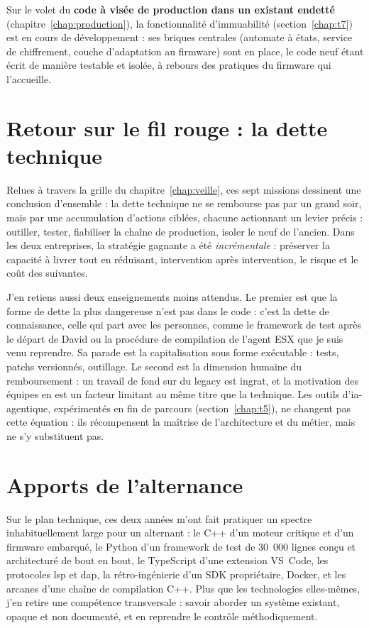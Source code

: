 Sur le volet du \textbf{code à visée de production dans un existant
endetté} (chapitre~\ref{chap:production}), la fonctionnalité d'immuabilité
(section~\ref{chap:t7}) est en cours de développement : ses briques
centrales (automate à états, service de chiffrement, couche d'adaptation au
firmware) sont en place, le code neuf étant écrit de manière testable et
isolée, à rebours des pratiques du firmware qui l'accueille.

\section{Retour sur le fil rouge : la dette technique}
Relues à travers la grille du chapitre~\ref{chap:veille}, ces sept missions
dessinent une conclusion d'ensemble : la dette technique ne se rembourse pas
par un grand soir, mais par une accumulation d'actions ciblées, chacune
actionnant un levier précis : outiller, tester, fiabiliser la chaîne de
production, isoler le neuf de l'ancien. Dans les deux entreprises, la
stratégie gagnante a été \emph{incrémentale} : préserver la capacité à livrer
tout en réduisant, intervention après intervention, le risque et le coût des
suivantes.

J'en retiens aussi deux enseignements moins attendus. Le premier est que la
forme de dette la plus dangereuse n'est pas dans le code : c'est la dette de
connaissance, celle qui part avec les personnes, comme le framework de test
après le départ de David ou la procédure de compilation de l'agent ESX que je
suis venu reprendre. Sa parade est la capitalisation sous forme exécutable :
tests, patchs versionnés, outillage. Le second est la dimension humaine du
remboursement : un travail de fond sur du legacy est ingrat, et la motivation
des équipes en est un facteur limitant au même titre que la technique. Les
outils d'\gls{ia-agentique}, expérimentés en fin de parcours
(section~\ref{chap:t5}), ne changent pas cette équation : ils récompensent
la maîtrise de l'architecture et du métier, mais ne s'y substituent pas.

\section{Apports de l'alternance}
Sur le plan technique, ces deux années m'ont fait pratiquer un spectre
inhabituellement large pour un alternant : le C++ d'un moteur critique et
d'un firmware embarqué, le Python d'un framework de test de 30~000 lignes
conçu et architecturé de bout en bout, le TypeScript d'une extension
VS~Code, les protocoles \gls{lsp} et \gls{dap}, la rétro-ingénierie d'un SDK
propriétaire, Docker, et les arcanes d'une chaîne de compilation C++. Plus
que les technologies elles-mêmes, j'en retire une compétence transversale :
savoir aborder un système existant, opaque et non documenté, et en reprendre
le contrôle méthodiquement.

